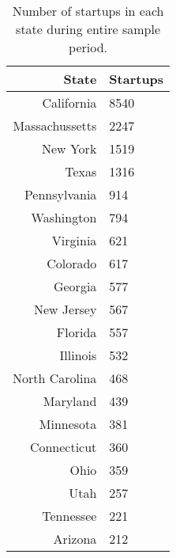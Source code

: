 \begin{table}[!htb]
\centering
\begingroup\small
\begin{tabular}{rl}
  \toprule
State & Startups \\ 
  \midrule
California & 8540 \\ 
  Massachussetts & 2247 \\ 
  New York & 1519 \\ 
  Texas & 1316 \\ 
  Pennsylvania & 914 \\ 
  Washington & 794 \\ 
  Virginia & 621 \\ 
  Colorado & 617 \\ 
  Georgia & 577 \\ 
  New Jersey & 567 \\ 
  Florida & 557 \\ 
  Illinois & 532 \\ 
  North Carolina & 468 \\ 
  Maryland & 439 \\ 
  Minnesota & 381 \\ 
  Connecticut & 360 \\ 
  Ohio & 359 \\ 
  Utah & 257 \\ 
  Tennessee & 221 \\ 
  Arizona & 212 \\ 
   \bottomrule
\end{tabular}
\endgroup
\caption{Number of startups in each state during entire sample period.} 
\end{table}
